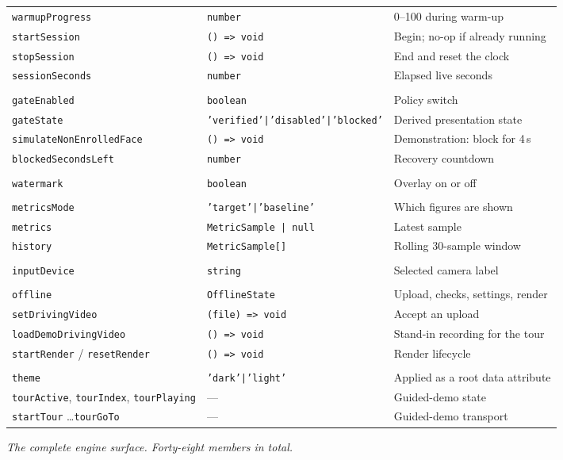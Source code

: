 \documentclass[11pt,a4paper]{report}
\newcommand{\code}[1]{\texttt{\small #1}}
\begin{document}
\begin{longtable}{L{4.9cm} L{4.0cm} L{6.0cm}}
\code{warmupProgress} & \code{number} & 0--100 during warm-up \\
\code{startSession} & \code{() => void} & Begin; no-op if already running \\
\code{stopSession} & \code{() => void} & End and reset the clock \\
\code{sessionSeconds} & \code{number} & Elapsed live seconds \\
\addlinespace
{}\\
\code{gateEnabled} & \code{boolean} & Policy switch \\
\code{gateState} & \code{'verified'|'disabled'|'blocked'} & Derived presentation state \\
\code{simulateNonEnrolledFace} & \code{() => void} & Demonstration: block for 4\,s \\
\code{blockedSecondsLeft} & \code{number} & Recovery countdown \\
\addlinespace
{}\\
\code{watermark} & \code{boolean} & Overlay on or off \\
\addlinespace
{}\\
\code{metricsMode} & \code{'target'|'baseline'} & Which figures are shown \\
\code{metrics} & \code{MetricSample | null} & Latest sample \\
\code{history} & \code{MetricSample[]} & Rolling 30-sample window \\
\addlinespace
{}\\
\code{inputDevice} & \code{string} & Selected camera label \\
\addlinespace
{}\\
\code{offline} & \code{OfflineState} & Upload, checks, settings, render \\
\code{setDrivingVideo} & \code{(file) => void} & Accept an upload \\
\code{loadDemoDrivingVideo} & \code{() => void} & Stand-in recording for the tour \\
\code{startRender} / \code{resetRender} & \code{() => void} & Render lifecycle \\
\addlinespace
{}\\
\code{theme} & \code{'dark'|'light'} & Applied as a root data attribute \\
\code{tourActive}, \code{tourIndex}, \code{tourPlaying} & --- & Guided-demo state \\
\code{startTour} \ldots \code{tourGoTo} & --- & Guided-demo transport \\
\bottomrule
\end{longtable}
\noindent\textit{\small The complete engine surface. Forty-eight members in total.}\par\medskip
\end{document}

